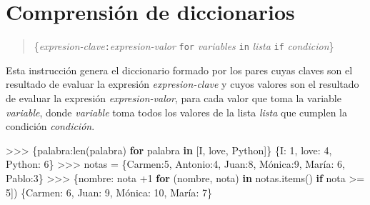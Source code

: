 \documentclass[
  spanish,
  a4paper,
]{scrreport}
\newenvironment{Shaded}{\begin{snugshade}}{\end{snugshade}}
\newcommand{\BuiltInTok}[1]{\textcolor[rgb]{0.00,0.23,0.31}{#1}}
\newcommand{\ControlFlowTok}[1]{\textcolor[rgb]{0.00,0.23,0.31}{\textbf{#1}}}
\newcommand{\DecValTok}[1]{\textcolor[rgb]{0.68,0.00,0.00}{#1}}
\newcommand{\KeywordTok}[1]{\textcolor[rgb]{0.00,0.23,0.31}{\textbf{#1}}}
\newcommand{\NormalTok}[1]{\textcolor[rgb]{0.00,0.23,0.31}{#1}}
\newcommand{\OperatorTok}[1]{\textcolor[rgb]{0.37,0.37,0.37}{#1}}
\newcommand{\StringTok}[1]{\textcolor[rgb]{0.13,0.47,0.30}{#1}}
\begin{document}
\section{Comprensión de
diccionarios}\label{comprensiuxf3n-de-diccionarios}

\begin{quote}
\{\emph{expresion-clave}\texttt{:}\emph{expresion-valor} \texttt{for}
\emph{variables} \texttt{in} \emph{lista} \texttt{if} \emph{condicion}\}
\end{quote}

Esta instrucción genera el diccionario formado por los pares cuyas
claves son el resultado de evaluar la expresión \emph{expresion-clave} y
cuyos valores son el resultado de evaluar la expresión
\emph{expresion-valor}, para cada valor que toma la variable
\emph{variable}, donde \emph{variable} toma todos los valores de la
lista \emph{lista} que cumplen la condición \emph{condición}.

\begin{Shaded}
\begin{Highlighting}[]
\OperatorTok{\textgreater{}\textgreater{}\textgreater{}}\NormalTok{ \{palabra:}\BuiltInTok{len}\NormalTok{(palabra) }\ControlFlowTok{for}\NormalTok{ palabra }\KeywordTok{in}\NormalTok{ [}\StringTok{\textquotesingle{}I\textquotesingle{}}\NormalTok{, }\StringTok{\textquotesingle{}love\textquotesingle{}}\NormalTok{, }\StringTok{\textquotesingle{}Python\textquotesingle{}}\NormalTok{]\}}
\NormalTok{\{}\StringTok{\textquotesingle{}I\textquotesingle{}}\NormalTok{: }\DecValTok{1}\NormalTok{, }\StringTok{\textquotesingle{}love\textquotesingle{}}\NormalTok{: }\DecValTok{4}\NormalTok{, }\StringTok{\textquotesingle{}Python\textquotesingle{}}\NormalTok{: }\DecValTok{6}\NormalTok{\}}
\OperatorTok{\textgreater{}\textgreater{}\textgreater{}}\NormalTok{ notas }\OperatorTok{=}\NormalTok{ \{}\StringTok{\textquotesingle{}Carmen\textquotesingle{}}\NormalTok{:}\DecValTok{5}\NormalTok{, }\StringTok{\textquotesingle{}Antonio\textquotesingle{}}\NormalTok{:}\DecValTok{4}\NormalTok{, }\StringTok{\textquotesingle{}Juan\textquotesingle{}}\NormalTok{:}\DecValTok{8}\NormalTok{, }\StringTok{\textquotesingle{}Mónica\textquotesingle{}}\NormalTok{:}\DecValTok{9}\NormalTok{, }\StringTok{\textquotesingle{}María\textquotesingle{}}\NormalTok{: }\DecValTok{6}\NormalTok{, }\StringTok{\textquotesingle{}Pablo\textquotesingle{}}\NormalTok{:}\DecValTok{3}\NormalTok{\}}
\OperatorTok{\textgreater{}\textgreater{}\textgreater{}}\NormalTok{ \{nombre: nota }\OperatorTok{+}\DecValTok{1} \ControlFlowTok{for}\NormalTok{ (nombre, nota) }\KeywordTok{in}\NormalTok{ notas.items() }\ControlFlowTok{if}\NormalTok{ nota }\OperatorTok{\textgreater{}=} \DecValTok{5}\NormalTok{])}
\NormalTok{\{}\StringTok{\textquotesingle{}Carmen\textquotesingle{}}\NormalTok{: }\DecValTok{6}\NormalTok{, }\StringTok{\textquotesingle{}Juan\textquotesingle{}}\NormalTok{: }\DecValTok{9}\NormalTok{, }\StringTok{\textquotesingle{}Mónica\textquotesingle{}}\NormalTok{: }\DecValTok{10}\NormalTok{, }\StringTok{\textquotesingle{}María\textquotesingle{}}\NormalTok{: }\DecValTok{7}\NormalTok{\}}
\end{Highlighting}
\end{Shaded}
\end{document}
